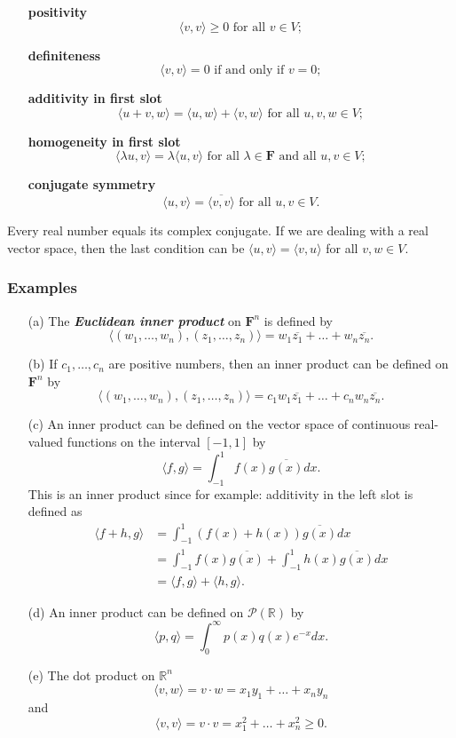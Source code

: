 \documentclass[11pt]{article}
\begin{document}
    \begin{enumerate}
        \item[] \textbf{positivity} \[\langle v,v \rangle \geq 0 \text{ for all } v \in V;\]
        \item[] \textbf{definiteness} \[\langle v,v \rangle = 0 \text{ if and only if } v = 0;\]
        \item[] \textbf{additivity in first slot} \[\langle u + v, w \rangle = \langle u,w \rangle + \langle v,w \rangle \text{ for all } u,v,w \in V;\]
        \item[] \textbf{homogeneity in first slot} \[\langle \lambda u, v \rangle = \lambda \langle u,v \rangle \text{ for all } \lambda \in \textbf{F} \text{ and all } u,v \in V;\]
        \item[] \textbf{conjugate symmetry} \[\langle u,v \rangle = \overline{\langle v,v \rangle} \text{ for all } u,v \in V.\]
    \end{enumerate}

    Every real number equals its complex conjugate. If we are dealing with a real vector space, then the last condition can be \(\langle u,v \rangle = \langle v,u \rangle\) for all \(v,w \in V\). 

    \subsubsection{Examples}
    \begin{enumerate}
        \item[(a)] The \textbf{\emph{Euclidean inner product}} on \(\textbf{F}^n\) is defined by \[\langle (w_1, \dots, w_n), (z_1, \dots, z_n) \rangle = w_1 \overline{z_1} + \dots + w_n \overline{z_n}.\]
        \item[(b)] If \(c_1, \dots, c_n\) are positive numbers, then an inner product can be defined on \(\textbf{F}^n\) by \[\langle (w_1, \dots, w_n), (z_1, \dots, z_n) \rangle = c_1 w_1 \overline{z_1} + \dots + c_n w_n \overline{z_n}.\]  
        \item[(c)] An inner product can be defined on the vector space of continuous real-valued functions on the interval \([-1,1]\) by \[\langle f,g \rangle = \int_{-1}^{1} f(x) \overline{g(x)}dx.\] This is an inner product since for example: additivity in the left slot is defined as
        \begin{align*}
            \langle f+h, g \rangle &= \int_{-1}^{1} (f(x) + h(x)) \overline{g(x)} dx \\
                                   &= \int_{-1}^{1} f(x) \overline{g(x)} + \int_{-1}^{1} h(x) \overline{g(x)} dx \\
                                   &= \langle f,g \rangle + \langle h,g \rangle.
        \end{align*} 
        \item[(d)] An inner product can be defined on \(\mathcal{P}(\mathbb{R})\) by \[\langle p,q \rangle = \int_{0}^{\infty} p(x) q(x) e^{-x} dx.\]  
        \item[(e)] The dot product on \(\mathbb{R}^n\) \[\langle v,w \rangle = v \cdot w = x_1 y_1 + \dots + x_n y_n\] and \[\langle v,v \rangle = v \cdot v = x_1^2 + \dots + x_n^2 \geq 0.\]
    \end{enumerate}
\end{document}
